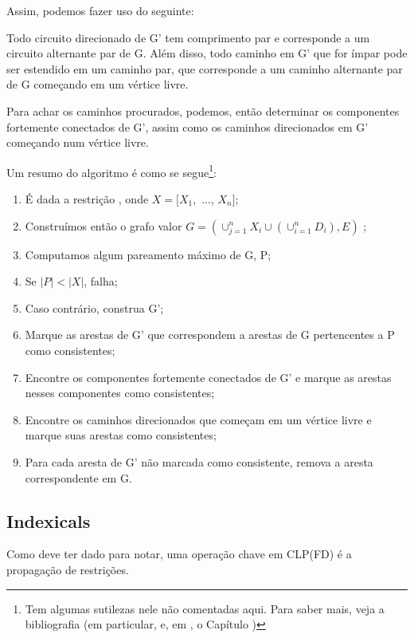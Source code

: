 \documentclass{article}
\begin{document}
Assim, podemos fazer uso do seguinte:

\begin{theorem}
  Todo circuito direcionado de G' tem comprimento par e corresponde a
  um circuito alternante par de G. Além disso, todo caminho em G' que
  for ímpar pode ser estendido em um caminho par, que corresponde a um
  caminho alternante par de G começando em um vértice livre.
\end{theorem}

Para achar os caminhos procurados, podemos, então determinar os
componentes fortemente conectados de G', assim como os caminhos
direcionados em G' começando num vértice livre.

Um resumo do algoritmo é como se segue\footnote{Tem algumas sutilezas
  nele não comentadas aqui. Para saber mais, veja a bibliografia (em
  particular, \cite{basileos} e, em \cite{cristo}, o Capítulo
  )}:

\begin{enumerate}
\item É dada a restrição , onde $X = [X_1,$
  ..., $X_n]$;
\item Construímos então o grafo valor $G =
  (\cup_{j=1}^nX_i\cup(\cup_{i=1}^nD_i),E)$ ;
\item Computamos algum pareamento máximo de G, P;
\item Se $|P| < |X|$, falha;
\item Caso contrário, construa G';
\item Marque as arestas de G' que correspondem a arestas de G
  pertencentes a P como consistentes;
\item Encontre os componentes fortemente conectados de G' e marque
  as arestas nesses componentes como consistentes;
\item Encontre os caminhos direcionados que começam em um vértice
  livre e marque suas arestas como consistentes;
\item Para cada aresta de G' não marcada como consistente, remova a
  aresta correspondente em G.
\end{enumerate}



\subsection{Indexicals}

Como deve ter dado para notar, uma operação chave em CLP(FD) é a
propagação de restrições.
\end{document}
